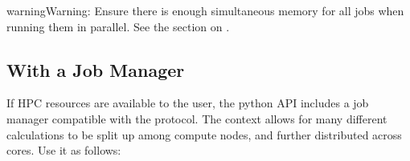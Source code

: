 \documentclass[letterpaper,10pt,english,openany,oneside]{sphinxmanual}
\begin{document}
\begin{sphinxadmonition}{warning}{Warning:}
\sphinxAtStartPar
Ensure there is enough simultaneous memory for all jobs when running
them in parallel. See the section on
.
\end{sphinxadmonition}


\subsection{With a Job Manager}
\label{\detokenize{multi_guide:with-a-job-manager}}
\sphinxAtStartPar
If HPC resources are available to the user, the python API
includes a job manager compatible with the
 protocol.
The {\hyperref[\detokenize{api/pytb.parallel.SlurmManager:pytb.parallel.SlurmManager}]{}} context allows for many different calculations
to be split up among compute nodes, and further distributed across
cores. Use it as follows:
\end{document}
